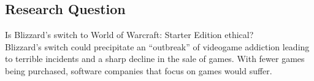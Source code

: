 \documentclass[11pt]{article}
\begin{document}
\begin{multicols}{2}

\section{Research Question}
Is Blizzard's switch to World of Warcraft: Starter Edition ethical? \\
Blizzard's switch could precipitate an ``outbreak'' of videogame addiction leading to terrible incidents \cite{SnowlyDeath} and a sharp decline in the sale of games. With fewer games being purchased, software companies that focus on games would suffer.





\end{multicols}
\end{document}
